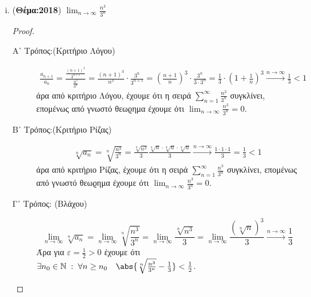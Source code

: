 \begin{enumerate}
\begin{enumerate}[i)]
            \item ({\bfseries Θέμα:2018}) $ \lim_{n \to \infty} \frac{n^{3}}{3^{n}} $ 
                \begin{proof}
                \begin{description}
                    \item [Α᾽ Τρόπος:(Κριτήριο Λόγου)]
                        \begin{align*}
                            \frac{a_{n+1}}{a_{n}} = 
                            \frac{\frac{(n+1)^{3}}{3^{n+1}}}{\frac{n^{3}}{3^{n}}} = 
                            \frac{(n+1)^{3}}{n^{3}} \cdot \frac{3^{n}}{3^{n+1}} = 
                            \left(\frac{n+1}{n} \right)^{3} \cdot \frac{3^{n}}{3\cdot 3^{n}} = 
                            \frac{1}{3} \cdot \left(1 + \frac{1}{n}\right)^{3} 
                            \xrightarrow{n \to \infty} \frac{1}{3} < 1
                        \end{align*}
                        άρα από κριτήριο Λόγου, έχουμε ότι η σειρά 
                        $ \sum_{n=1}^{\infty} \frac{n^{3}}{3^{n}} $ συγκλίνει, επομένως 
                        από γνωστό θεωϱημα έχουμε ότι $ \lim_{n \to \infty} 
                        \frac{n^{3}}{3^{n}} = 0 $.

                    \item [Β᾽ Τρόπος:(Κριτήριο Ρίζας)]
                        \begin{align*}
                            \sqrt[n]{a_{n}} = \sqrt[n]{\frac{n^{3}}{3^{n}}} = 
                            \frac{\sqrt[n]{n^{3}}}{3} \frac{\sqrt[n]{n} 
                                \cdot \sqrt[n]{n} \cdot \sqrt[n]{n}
                            }{3} \xrightarrow{n \to \infty} \frac{1 \cdot 1 \cdot 1}{3} = 
                            \frac{1}{3} < 1
                        \end{align*}
                        άρα από κριτήριο Ρίζας, έχουμε ότι η σειρά 
                        $ \sum_{n=1}^{\infty} \frac{n^{3}}{3^{n}} $ συγκλίνει, επομένως 
                        από γνωστό θεωϱημα έχουμε ότι $ \lim_{n \to \infty} 
                        \frac{n^{3}}{3^{n}} = 0 $.

                    \item [Γ᾽ Τρόπος: (Βλάχου)]
                        \[
                            \lim_{n \to \infty} \sqrt[n]{a_{n}} = \lim_{n \to \infty} 
                            \sqrt[n]{\frac{n^{3}}{3^{n}}} = \lim_{n \to \infty} 
                            \frac{\sqrt[n]{n^{3}}}{3} = \lim_{n \to \infty} 
                            \frac{(\sqrt[n]{n})^{3}}{3} \xrightarrow{n \to \infty} 
                            \frac{1}{3}  
                        \] 
                        Άρα για $ \varepsilon = \frac{1}{2} >0 $ έχουμε ότι $ \exists n_{0} 
                        \in \mathbb{N} \; : \; \forall n \geq n_{0} \quad 
                        \abs{\sqrt[n]{\frac{n^{3}}{3^{n}}} - \frac{1}{3}} < 
                        \frac{1}{2} $.


\end{description}
\end{proof}
\end{enumerate}
\end{enumerate}
